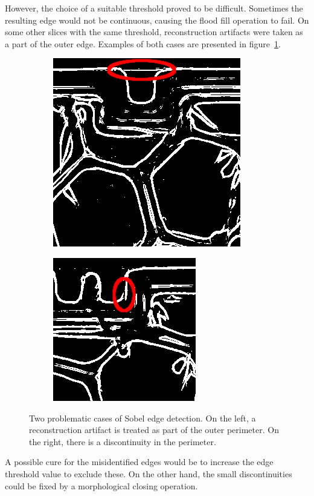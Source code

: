 \documentclass[a4paper,twoside,12pt]{article}
\begin{document}
However, the choice of a suitable threshold proved to be difficult. Sometimes the resulting edge would not be continuous, causing the flood fill operation to fail. On some other slices with the same threshold, reconstruction artifacts were taken as a part of the outer edge. Examples of both cases are presented in figure~\ref{fig:failed_sobel}.
\begin{figure}
    \centering
    \begin{subfigure}{0.5\textwidth}
        \centering
        \includegraphics[width=0.8\linewidth]{images/sobel_binary_208.png}
    \end{subfigure}%
    \begin{subfigure}{0.5\textwidth}
        \centering
        \includegraphics[width=0.8\linewidth]{images/sobel_binary_290.png}
    \end{subfigure}
    \caption{Two problematic cases of Sobel edge detection. On the left, a reconstruction artifact is treated as part of the outer perimeter. On the right, there is a discontinuity in the perimeter.}
    \label{fig:failed_sobel}
\end{figure}
A possible cure for the misidentified edges would be to increase the edge threshold value to exclude these. On the other hand, the small discontinuities could be fixed by a morphological closing operation.
\end{document}
